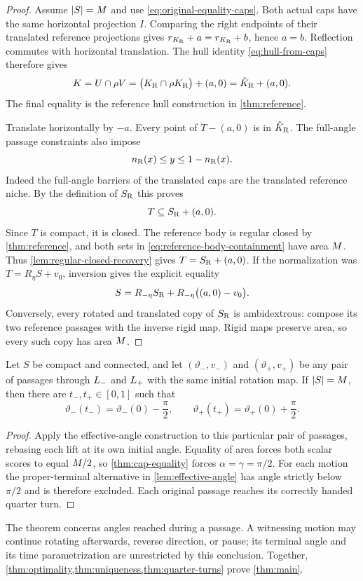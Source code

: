 \begin{proof}
Assume $|S|=M$ and use \eqref{eq:original-equality-caps}.
Both actual caps have the same horizontal projection $I$.
Comparing the right endpoints of their translated reference
projections gives $r_{K_{\mathrm R}}+a=r_{K_{\mathrm R}}+b$, hence $a=b$.
Reflection commutes with horizontal translation. The hull identity
\eqref{eq:hull-from-caps} therefore gives
\begin{equation}\label{eq:original-equality-hull}
 K=U\cap\rho V
   =\bigl(K_{\mathrm R}\cap\rho K_{\mathrm R}\bigr)+(a,0)
   =\hat K_{\mathrm R}+(a,0).
\end{equation}
The final equality is the reference hull construction in
\cref{thm:reference}.

Translate horizontally by $-a$. Every point of $T-(a,0)$ is in
$\hat K_{\mathrm R}$. The full-angle passage constraints also impose
\[
 n_{\mathrm R}(x)\le y\le1-n_{\mathrm R}(x).
\]
Indeed the full-angle barriers of the translated caps are the
translated reference niche. By the definition of $S_{\mathrm R}$ this proves
\begin{equation}\label{eq:reference-body-containment}
 T\subseteq S_{\mathrm R}+(a,0).
\end{equation}
Since $T$ is compact, it is closed. The reference body is regular
closed by \cref{thm:reference}, and both sets in
\eqref{eq:reference-body-containment} have area $M$.
Thus \cref{lem:regular-closed-recovery} gives
$T=S_{\mathrm R}+(a,0)$. If the normalization was
$T=R_\eta S+v_0$, inversion gives the explicit equality
\[
 S=R_{-\eta}S_{\mathrm R}+R_{-\eta}\bigl((a,0)-v_0\bigr).
\]
Conversely, every rotated and translated copy of $S_{\mathrm R}$ is
ambidextrous: compose its two reference passages with the inverse
rigid map. Rigid maps preserve area, so every such copy has area
$M$.
\end{proof}

\begin{theorem}\label{thm:quarter-turns}
Let $S$ be compact and connected, and let
$(\vartheta_-,v_-)$ and $(\vartheta_+,v_+)$ be any pair of
passages through $L_-$ and $L_+$ with the same initial rotation
map. If $|S|=M$, then there are $t_-,t_+\in[0,1]$ such that
\[
 \vartheta_-(t_-)=\vartheta_-(0)-\frac\pi2,\qquad
 \vartheta_+(t_+)=\vartheta_+(0)+\frac\pi2.
\]
\end{theorem}

\begin{proof}
Apply the effective-angle construction to this particular pair of
passages, rebasing each lift at its own initial angle. Equality of
area forces both scalar scores to equal $M/2$, so
\cref{thm:cap-equality} forces $\alpha=\gamma=\pi/2$.
For each motion the proper-terminal alternative in
\cref{lem:effective-angle} has angle strictly below $\pi/2$ and is
therefore excluded. Each original passage reaches its correctly
handed quarter turn.
\end{proof}

The theorem concerns angles reached during a passage. A witnessing
motion may continue rotating afterwards, reverse direction, or pause;
its terminal angle and its time parametrization are unrestricted by
this conclusion. Together, \cref{thm:optimality,thm:uniqueness,thm:quarter-turns}
prove \cref{thm:main}.
